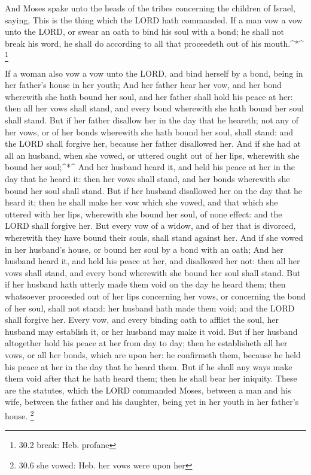  And Moses spake unto the heads of the tribes concerning the
children of Israel, saying, This is the thing which the LORD hath
commanded.  If a man vow a vow unto the LORD, or swear an
oath to bind his soul with a bond; he shall not break his word, he shall
do according to all that proceedeth out of his mouth.\^{}*\^{}
\footnote{30.2 break: Heb. profane}

 If a woman also vow a vow unto the LORD, and bind herself
by a bond, being in her father's house in her youth;  And
her father hear her vow, and her bond wherewith she hath bound her soul,
and her father shall hold his peace at her: then all her vows shall
stand, and every bond wherewith she hath bound her soul shall stand.
 But if her father disallow her in the day that he heareth;
not any of her vows, or of her bonds wherewith she hath bound her soul,
shall stand: and the LORD shall forgive her, because her father
disallowed her.  And if she had at all an husband, when she
vowed, or uttered ought out of her lips, wherewith she bound her
soul;\^{}*\^{}  And her husband heard it, and held his peace
at her in the day that he heard it: then her vows shall stand, and her
bonds wherewith she bound her soul shall stand.  But if her
husband disallowed her on the day that he heard it; then he shall make
her vow which she vowed, and that which she uttered with her lips,
wherewith she bound her soul, of none effect: and the LORD shall forgive
her.  But every vow of a widow, and of her that is divorced,
wherewith they have bound their souls, shall stand against her.
 And if she vowed in her husband's house, or bound her soul
by a bond with an oath;  And her husband heard it, and held
his peace at her, and disallowed her not: then all her vows shall stand,
and every bond wherewith she bound her soul shall stand. 
But if her husband hath utterly made them void on the day he heard them;
then whatsoever proceeded out of her lips concerning her vows, or
concerning the bond of her soul, shall not stand: her husband hath made
them void; and the LORD shall forgive her.  Every vow, and
every binding oath to afflict the soul, her husband may establish it, or
her husband may make it void.  But if her husband
altogether hold his peace at her from day to day; then he establisheth
all her vows, or all her bonds, which are upon her: he confirmeth them,
because he held his peace at her in the day that he heard them.
 But if he shall any ways make them void after that he hath
heard them; then he shall bear her iniquity.  These are the
statutes, which the LORD commanded Moses, between a man and his wife,
between the father and his daughter, being yet in her youth in her
father's house. \footnote{30.6 she vowed: Heb. her vows were upon her}

